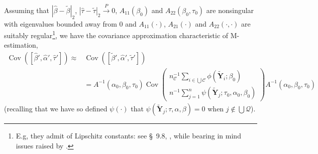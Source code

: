 \documentclass{article}
\begin{document}
Assuming that $|\hat\beta -\tilde\beta|_{2}$, 
$|\hat\tau -\tilde\tau|_{2} \stackrel{P}{\rightarrow} 0$,
$A_{11}(\beta_{0})$ and $A_{22}(\beta_{0}, \tau_{0})$ are nonsingular
with eigenvalues bounded away from 0 and $A_{11}(\cdot)$, $A_{21}(\cdot)$ and $A_{22}(\cdot, \cdot)$ are suitably
regular\footnote{E.g, they admit of Lipschitz constants: see \S~9.8,
  , while bearing in mind issues raised
  by .}, 
we have the covariance approximation characteristic of M-estimation,
\begin{align*} \operatorname{Cov}([\hat\beta',\hat\alpha', \hat\tau']) \approx&
  \operatorname{Cov}([\tilde\beta',\hat\alpha',\tilde\tau'])\\
  &=
  A^{-1}(\alpha_{0}, \beta_{0}, \tau_{0}) \operatorname{Cov}\left(
     \begin{array}{c}
       n_{\mathcal{C}}^{-1}\sum_{i\in \bigcup \mathcal{C}}\phi(\tilde{\mathbf{Y}}_{i}; \beta_{0} )\\
       n^{-1}\sum_{j=1}^{n}\psi(\tilde{\mathbf{Y}}_{j}; \tau_{0}, \alpha_{0}, \beta_{0} )
     \end{array}
\right)A^{-1}(\alpha_{0}, \beta_{0}, \tau_{0})
\end{align*}
(recalling that we have so defined $\psi(\cdot)$ that $\psi(\tilde{\mathbf{Y}}_{j}; \tau, \alpha, \beta) = 0$ when
$j\not\in \bigcup \mathcal{Q}$).
\end{document}
